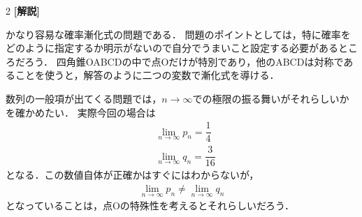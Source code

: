\documentclass[../../main.tex]{subfiles}
\begin{document}
\begin{multicols}{2}
  {\bf [解説]}

  かなり容易な確率漸化式の問題である．
  問題のポイントとしては，特に確率をどのように指定するか明示がないので自分でうまいこと設定する必要があるところだろう．
  四角錐OABCDの中で点Oだけが特別であり，他のABCDは対称であることを使うと，解答のように二つの変数で漸化式を導ける．

  数列の一般項が出てくる問題では，$n\to\infty$での極限の振る舞いがそれらしいかを確かめたい．
  実際今回の場合は
  \begin{align}
    & \lim_{n\to\infty} p_n = \dfrac{1}{4}  \\
    & \lim_{n\to\infty} q_n = \dfrac{3}{16}
  \end{align}
  となる．この数値自体が正確かはすぐにはわからないが，
  \begin{align}
    \lim_{n\to\infty} p_n \neq \lim_{n\to\infty} q_n
  \end{align}
  となっていることは，点Oの特殊性を考えるとそれらしいだろう．

  \newpage
\end{multicols}
\end{document}
